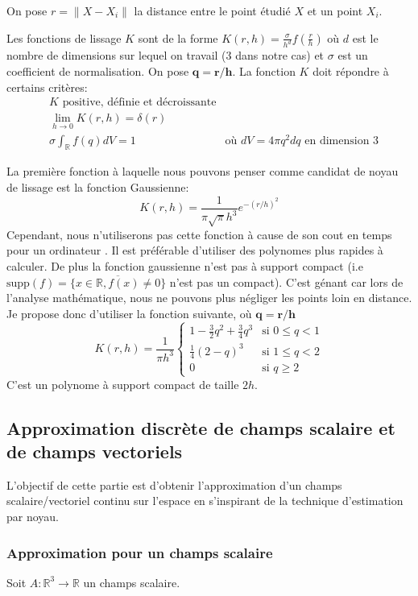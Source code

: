 \documentclass[a4paper,10pt]{report}
\begin{document}
On pose $r= \lVert X - X_i \rVert$ la distance entre le point étudié $X$ et un point $X_i$.

Les fonctions de lissage $K$ sont de la forme $K(r, h) = \frac{\sigma}{h^d}f(\frac{r}{h})$ où $d$ est le nombre de dimensions sur lequel on travail (3 dans notre cas) et $\sigma$ est un coefficient de normalisation. On pose $\mathbf{q = r/h}$. La fonction $K$ doit répondre à certains critères:
\begin{align*}
 & K \text{ positive, définie et décroissante} \\
 & \lim_{h \to 0}K(r,h) = \delta(r) \\
 & \sigma \int_\mathbb{R} f(q)dV = 1 & \text{où } dV = 4\pi q^2 dq \text{ en dimension 3}
\end{align*}

La première fonction à laquelle nous pouvons penser comme candidat de noyau de lissage est la fonction Gaussienne:
$$K(r,h) = \frac{1}{\pi\sqrt{\pi} h^3}e^{-(r/h)^2}$$
Cependant, nous n'utiliserons pas cette fonction à cause de son cout en temps pour un ordinateur . Il est préférable d'utiliser des polynomes plus rapides à calculer. De plus la fonction gaussienne n'est pas à support compact (i.e $\text{supp}(f) = \overline{\{x \in \mathbb{R}, f(x) \neq 0 \}}$ n'est pas un compact). C'est génant car lors de l'analyse mathématique, nous ne pouvons plus négliger les points loin en distance. Je propose donc d'utiliser la fonction suivante, où $\mathbf{q = r/h}$
$$\boxed{
K(r,h) = \frac{1}{\pi h^3}
\begin{cases}
 1 - \frac{3}{2}q^2 + \frac{3}{4}q^3 & \text{si } 0 \le q < 1 \\
 \frac{1}{4}(2-q)^3 & \text{si } 1 \le q < 2 \\
 0 & \text{si } q \ge 2
\end{cases}}$$
C'est un polynome à support compact de taille $2h$.

\subsection{Approximation discrète de champs scalaire et de champs vectoriels}
L'objectif de cette partie est d'obtenir l'approximation d'un champs scalaire/vectoriel continu sur l'espace en s'inspirant de la technique d'estimation par noyau.

\subsubsection{Approximation pour un champs scalaire}
Soit $A: \mathbb{R}^3 \to \mathbb{R}$ un champs scalaire.
\end{document}
